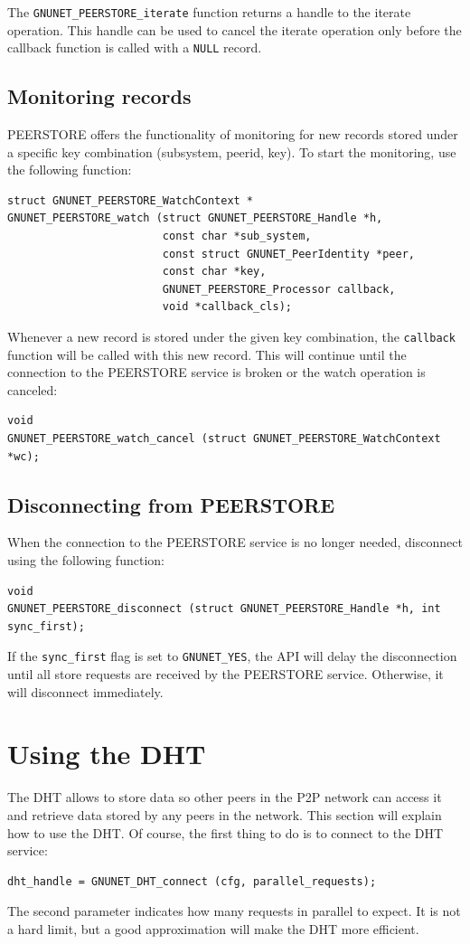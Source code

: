 \documentclass[10pt]{article}
\begin{document}
The \lstinline|GNUNET_PEERSTORE_iterate| function returns a handle to the iterate operation. This
handle can be used to cancel the iterate operation only before the callback function is called with
a \lstinline|NULL| record.

\subsection{Monitoring records}

PEERSTORE offers the functionality of monitoring for new records stored under a specific key
combination (subsystem, peerid, key). To start the monitoring, use the following function:
\begin{lstlisting}
struct GNUNET_PEERSTORE_WatchContext *
GNUNET_PEERSTORE_watch (struct GNUNET_PEERSTORE_Handle *h,
                        const char *sub_system,
                        const struct GNUNET_PeerIdentity *peer,
                        const char *key,
                        GNUNET_PEERSTORE_Processor callback,
                        void *callback_cls);
\end{lstlisting}

Whenever a new record is stored under the given key combination, the \lstinline|callback| function
will be called with this new record. This will continue until the connection to the PEERSTORE service
is broken or the watch operation is canceled:
\begin{lstlisting}
void
GNUNET_PEERSTORE_watch_cancel (struct GNUNET_PEERSTORE_WatchContext *wc);
\end{lstlisting}

\subsection{Disconnecting from PEERSTORE}

When the connection to the PEERSTORE service is no longer needed, disconnect using the following
function:
\begin{lstlisting}
void
GNUNET_PEERSTORE_disconnect (struct GNUNET_PEERSTORE_Handle *h, int sync_first);
\end{lstlisting}

If the \lstinline|sync_first| flag is set to \lstinline|GNUNET_YES|, the API will delay the
disconnection until all store requests are received by the PEERSTORE service. Otherwise,
it will disconnect immediately.

\section{Using the DHT}
The DHT allows to store data so other peers in the P2P network can
access it and retrieve data stored by any peers in the network.
This section will explain how to use the DHT. Of course, the first
thing to do is to connect to the DHT service:
\lstset{language=C}
\begin{lstlisting}
dht_handle = GNUNET_DHT_connect (cfg, parallel_requests);
\end{lstlisting}
The second parameter indicates how many requests in parallel to expect.
It is not a hard limit, but a good approximation will make the DHT more
efficient.
\end{document}
